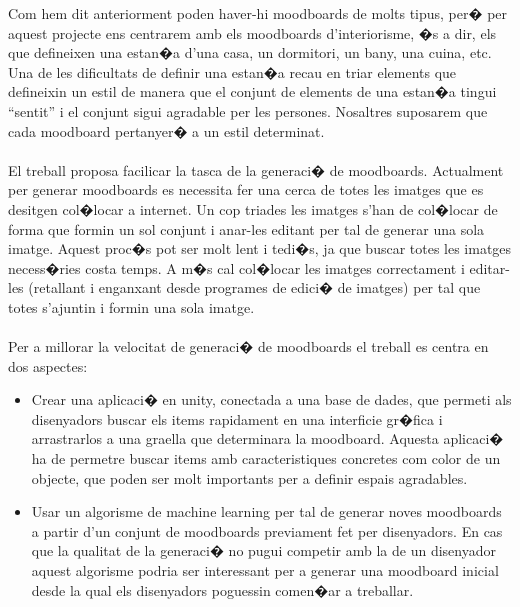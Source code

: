 \documentclass[12pt,a4paper,openright,oneside]{article}
\numberwithin{equation}{section}
\theoremstyle{definition}
\begin{document}
Com hem dit anteriorment poden haver-hi moodboards de molts tipus, per� per aquest projecte ens centrarem amb els moodboards d'interiorisme, �s a dir, els que defineixen una estan�a d'una casa, un dormitori, un bany, una cuina, etc.  Una de les dificultats de definir  una estan�a recau en triar elements que defineixin un estil de manera que el conjunt de elements de una estan�a tingui ``sentit'' i el conjunt sigui agradable per les persones. Nosaltres suposarem que cada moodboard pertanyer� a un estil determinat. %
\\\\
El treball proposa facilicar la tasca de la generaci� de moodboards. Actualment per generar moodboards es necessita fer una cerca de totes les imatges que es desitgen col�locar a internet. Un cop triades les imatges s'han de col�locar de forma que formin un sol conjunt i anar-les editant per tal de generar una sola imatge.  Aquest proc�s pot ser molt lent i tedi�s, ja que buscar totes les imatges necess�ries costa temps. A m�s cal col�locar les imatges correctament i editar-les (retallant i enganxant desde programes de edici� de imatges) per tal que totes s'ajuntin i formin una sola imatge.  \\\\
Per a millorar la velocitat de generaci� de moodboards el treball es centra en dos aspectes:
\begin{itemize}
\item Crear una aplicaci� en unity, conectada a una base de dades, que permeti als disenyadors buscar els items rapidament en una interficie gr�fica i arrastrarlos a una graella que determinara la moodboard. Aquesta aplicaci� ha de permetre buscar items amb caracteristiques concretes com color de un objecte, que poden ser molt importants per a definir espais agradables.
\item Usar un algorisme de machine learning per tal de generar noves moodboards a partir d'un conjunt de moodboards previament fet per disenyadors. En cas que la qualitat de la generaci� no pugui competir amb la de un disenyador aquest algorisme podria ser interessant per a generar una moodboard inicial desde la qual els disenyadors poguessin comen�ar a treballar.
\end{itemize}
\end{document}
